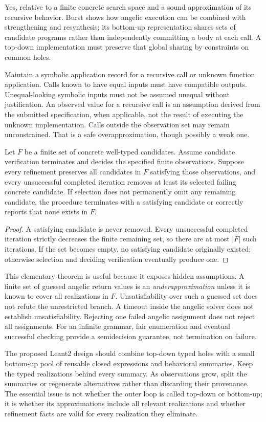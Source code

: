 \answer Yes, relative to a finite concrete search space and a sound approximation of its recursive behavior. Burst shows how angelic execution can be combined with strengthening and resynthesis; its bottom-up representation shares sets of candidate programs rather than independently committing a body at each call.\cite{burst} A top-down implementation must preserve that global sharing by constraints on common holes.

Maintain a symbolic application record for a recursive call or unknown function application. Calls known to have equal inputs must have compatible outputs. Unequal-looking symbolic inputs must not be assumed unequal without justification. An observed value for a recursive call is an assumption derived from the submitted specification, when applicable, not the result of executing the unknown implementation. Calls outside the observation set may remain unconstrained. That is a safe overapproximation, though possibly a weak one.

\begin{theorem}\label{thm:finite-refine}
Let $F$ be a finite set of concrete well-typed candidates. Assume candidate verification terminates and decides the specified finite observations. Suppose every refinement preserves all candidates in $F$ satisfying those observations, and every unsuccessful completed iteration removes at least its selected failing concrete candidate. If selection does not permanently omit any remaining candidate, the procedure terminates with a satisfying candidate or correctly reports that none exists in $F$.
\end{theorem}
\begin{proof}
A satisfying candidate is never removed. Every unsuccessful completed iteration strictly decreases the finite remaining set, so there are at most $|F|$ such iterations. If the set becomes empty, no satisfying candidate originally existed; otherwise selection and deciding verification eventually produce one.
\end{proof}

This elementary theorem is useful because it exposes hidden assumptions. A finite set of guessed angelic return values is an \emph{underapproximation} unless it is known to cover all realizations in $F$. Unsatisfiability over such a guessed set does not refute the unrestricted branch. A timeout inside the angelic solver does not establish unsatisfiability. Rejecting one failed angelic assignment does not reject all assignments. For an infinite grammar, fair enumeration and eventual successful checking provide a semidecision guarantee, not termination on failure.

The proposed Leant2 design should combine top-down typed holes with a small bottom-up pool of reusable closed expressions and behavioral summaries. Keep the typed realizations behind every summary. As observations grow, split the summaries or regenerate alternatives rather than discarding their provenance. The essential issue is not whether the outer loop is called top-down or bottom-up; it is whether its approximations include all relevant realizations and whether refinement facts are valid for every realization they eliminate.

